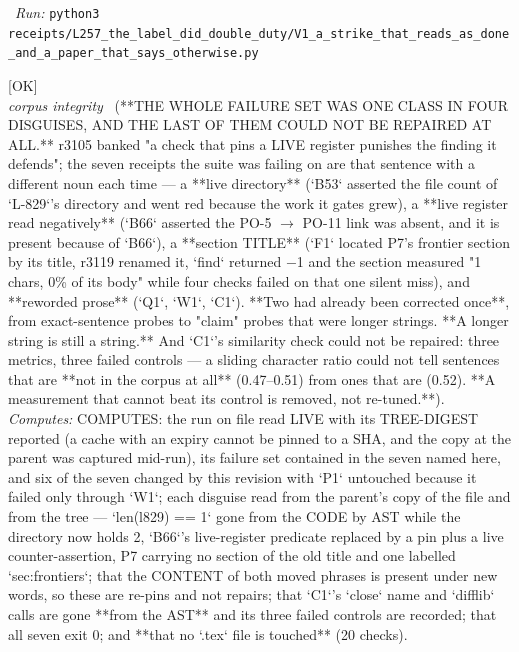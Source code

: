 \begin{description}
\ \emph{Run:} \texttt{python3 receipts/L257\_the\_label\_did\_double\_duty/V1\_a\_strike\_that\_reads\_as\_done\_and\_a\_paper\_that\_says\_otherwise.py}
\item[\label{rcpt:M1_five_checks_pinned_to_things_that_move_and_one_that_no_control_could_separate}\texttt{M1\_five\_checks\_pinned\_to\_things\_that\_move\_and\_one\_that\_no\_control\_could\_separate}]\hfill\textsf{[OK]}\\
\textit{corpus integrity} \ (**THE WHOLE FAILURE SET WAS ONE CLASS IN FOUR DISGUISES, AND THE LAST OF THEM COULD NOT BE REPAIRED AT ALL.** r3105 banked "a check that pins a LIVE register punishes the finding it defends"; the seven receipts the suite was failing on are that sentence with a different noun each time --- a **live directory** (`B53` asserted the file count of `L-829`'s directory and went red because the work it gates grew), a **live register read negatively** (`B66` asserted the PO-5 \ensuremath{\to} PO-11 link was absent, and it is present because of `B66`), a **section TITLE** (`F1` located P7's frontier section by its title, r3119 renamed it, `find` returned \ensuremath{-}1 and the section measured "1 chars, 0\% of its body" while four checks failed on that one silent miss), and **reworded prose** (`Q1`, `W1`, `C1`). **Two had already been corrected once**, from exact-sentence probes to "claim" probes that were longer strings. **A longer string is still a string.** And `C1`'s similarity check could not be repaired: three metrics, three failed controls --- a sliding character ratio could not tell sentences that are **not in the corpus at all** (0.47--0.51) from ones that are (0.52). **A measurement that cannot beat its control is removed, not re-tuned.**). 
\emph{Computes:} COMPUTES: the run on file read LIVE with its TREE-DIGEST reported (a cache with an expiry cannot be pinned to a SHA, and the copy at the parent was captured mid-run), its failure set contained in the seven named here, and six of the seven changed by this revision with `P1` untouched because it failed only through `W1`; each disguise read from the parent's copy of the file and from the tree --- `len(l829) == 1` gone from the CODE by AST while the directory now holds 2, `B66`'s live-register predicate replaced by a pin plus a live counter-assertion, P7 carrying no section of the old title and one labelled `sec:frontiers`; that the CONTENT of both moved phrases is present under new words, so these are re-pins and not repairs; that `C1`'s `close` name and `difflib` calls are gone **from the AST** and its three failed controls are recorded; that all seven exit 0; and **that no `.tex` file is touched** (20 checks).

\end{description}

